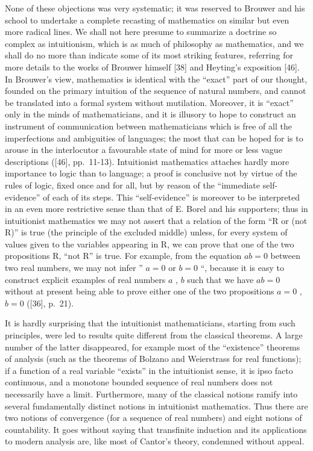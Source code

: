 None of these objections was very systematic; it was reserved to Brouwer and his school to undertake a complete recasting of mathematics on similar but even more radical lines. We shall not here presume to summarize a doctrine so complex as intuitionism, which is as much of philosophy as mathematics, and we shall do no more than indicate some of its most striking features, referring for more details to the works of Brouwer himself {[}38{]} and Heyting's exposition {[}46{]}. In Brouwer's view, mathematics is identical with the ``exact'' part of our thought, founded on the primary intuition of the sequence of natural numbers, and cannot be translated into a formal system without mutilation. Moreover, it is ``exact'' only in the minds of mathematicians, and it is illusory to hope to construct an instrument of communication between mathematicians which is free of all the imperfections and ambiguities of languages; the most that can be hoped for is to arouse in the interlocutor a favourable state of mind for more or less vague descriptions ({[}46{]}, pp.~11-13). Intuitionist mathematics attaches hardly more importance to logic than to language; a proof is conclusive not by virtue of the rules of logic, fixed once and for all, but by reason of the ``immediate self-evidence'' of each of its steps. This ``self-evidence'' is moreover to be interpreted in an even more restrictive sense than that of E. Borel and his supporters; thus in intuitionist mathematics we may not assert that a relation of the form ``R or (not R)'' is true (the principle of the excluded middle) unless, for every system of values given to the variables appearing in R, we can prove that one of the two propositions R, ``not R'' is true. For example, from the equation \(ab = 0\) between two real numbers, we may not infer '' \(a = 0\) or \(b = 0\) ``, because it is easy to construct explicit examples of real numbers \(a\) , \(b\) such that we have \(ab = 0\) without at present being able to prove either one of the two propositions \(a = 0\) , \(b = 0\) ({[}36{]}, p.~21).

It is hardly surprising that the intuitionist mathematicians, starting from such principles, were led to results quite different from the classical theorems. A large number of the latter disappeared, for example most of the ``existence'' theorems of analysis (such as the theorems of Bolzano and Weierstrass for real functions); if a function of a real variable ``exists'' in the intuitionist sense, it is ipso facto continuous, and a monotone bounded sequence of real numbers does not necessarily have a limit. Furthermore, many of the classical notions ramify into several fundamentally distinct notions in intuitionist mathematics. Thus there are two notions of convergence (for a sequence of real numbers) and eight notions of countability. It goes without saying that transfinite induction and its applications to modern analysis are, like most of Cantor's theory, condemned without appeal.

